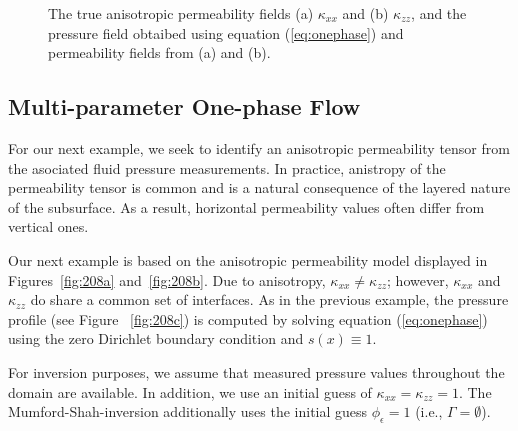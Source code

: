 \documentclass[manuscript,revised]{geophysics}
\begin{document}
{\begin{figure}
\caption{The true anisotropic permeability fields (a) $\kappa_{xx}$ and (b) $\kappa_{zz}$, and the pressure field obtaibed using equation (\ref{eq:onephase}) and permeability fields from (a) and (b).}
\label{fig:208}
\end{figure}
}

\subsection{Multi-parameter One-phase Flow}
For our next example, we seek to identify an anisotropic permeability tensor from the asociated fluid pressure measurements.  In practice, anistropy of the permeability tensor is common and is a natural consequence of the layered nature of the subsurface.  As a result, horizontal permeability values often differ from vertical ones.

Our next example is based on the anisotropic permeability model displayed in Figures~\ref{fig:208a} and~\ref{fig:208b}.  Due to anisotropy, $\kappa_{xx} \neq \kappa_{zz}$; however, $\kappa_{xx}$ and $\kappa_{zz}$ do share a common set of interfaces.  As in the previous example, the pressure profile (see Figure ~\ref{fig:208c}) is  computed by solving equation (\ref{eq:onephase}) using the zero Dirichlet boundary condition and $s(x) \equiv 1$.  

For inversion purposes, we assume that measured pressure values throughout the domain are available.  In addition, we use an initial guess of $\kappa_{xx}=\kappa_{zz}=1$.  The Mumford-Shah-inversion additionally uses the initial guess $\phi_\epsilon=1$ (i.e., $\Gamma=\emptyset$).
\end{document}
